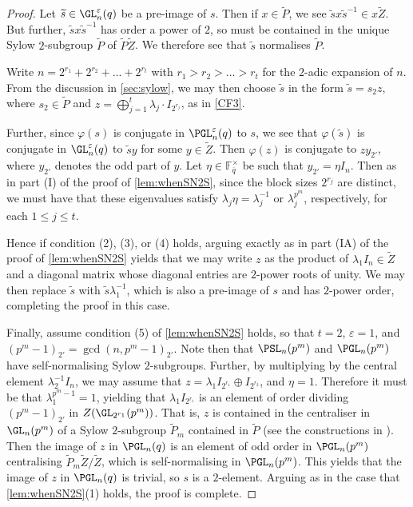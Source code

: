 \documentclass[eqthmnum, nocolour]{jt-calcs}
\newcommand{\wt}[1]{\widetilde{#1}}
\renewcommand{\epsilon}{\varepsilon}
\begin{document}
\begin{proof}
Let $\wt{s}\in \GL^\epsilon_n(q)$ be a pre-image of $s$.     Then if $x\in\wt{P}$, we see $\wt{s}x\wt{s}^{-1}\in x \wt{Z}$. But further, $\wt{s}x\wt{s}^{-1}$ has order a power of $2$, so must be contained in the unique Sylow $2$-subgroup $\wt{P}$ of $\wt{P}\wt{Z}$.  We therefore see that $\wt{s}$ normalises $\wt{P}$.  

Write $n=2^{r_1}+2^{r_2}+...+2^{r_t}$ with $r_1>r_2>...>r_t$ for the $2$-adic expansion of $n$.  From the discussion in \cref{sec:sylow}, we may then choose $\wt{s}$ in the form $\wt{s}=s_2z$, where $s_2\in \wt{P}$ and $z=\bigoplus_{j=1}^t \lambda_j\cdot I_{2^{r_j}}$, as in \eqref{CF3}.

Further, since $\varphi(s)$ is conjugate in $\PGL^\epsilon_n(q)$ to $s$, we see that $\varphi(\tilde{s})$ is conjugate in $\GL^\epsilon_n(q)$ to $\wt{s}y$ for some $y\in\wt{Z}$.  Then $ \varphi(z)$ is conjugate to $z y_{2'}$, where $y_{2'}$ denotes the odd part of $y$.  Let $\eta\in \mathbb{F}_{\overline{q}}^\times$ be such that $y_{2'}=\eta I_{n}$. Then as in part (I) of the proof of \cref{lem:whenSN2S}, since the block sizes $2^{r_j}$ are distinct, we must have that these eigenvalues satisfy $\lambda_j\eta=\lambda_j^{-1}$ or   $\lambda_j^{p^m}$, respectively, for each $1\leq j\leq t$.  

Hence if condition (2), (3), or (4) holds, arguing exactly as in part (IA) of the proof of \cref{lem:whenSN2S} yields that we may write $z$ as the product of $\lambda_1I_n\in\wt{Z}$ and a diagonal matrix whose diagonal entries are $2$-power roots of unity.  We may then replace $\wt{s}$ with $\wt{s}\lambda_1^{-1}$, which is also a pre-image of $s$ and has $2$-power order, completing the proof in this case.

Finally, assume condition (5) of \cref{lem:whenSN2S} holds, so that $t=2$, $\epsilon=1$, and $(p^m-1)_{2'}=\gcd(n, p^m-1)_{2'}$.  Note then that $\PSL_n(p^m)$ and $\PGL_n(p^m)$ have self-normalising Sylow $2$-subgroups.  Further, by multiplying by the central element $\lambda_2^{-1}I_n$, we may assume that $z=\lambda_1 I_{2^{r_1}}\oplus I_{2^{r_2}}$, and $\eta=1$.  Therefore it must be that $\lambda_1^{p^m-1}=1$, yielding that $\lambda_1 I_{2^{r_1}}$ is an element of order dividing $(p^m-1)_{2'}$ in $Z(\GL_{2^{r_1}}(p^m))$.  That is, $z$ is contained in the centraliser in $\GL_n(p^m)$ of a Sylow $2$-subgroup $\wt{P}_m$ contained in $\wt{P}$ (see the constructions in \cite{carter-fong:1964:the-Sylow-2-subgroups}).  Then the image of $z$ in $\PGL_n(q)$ is an element of odd order in $\PGL_n(p^m)$ centralising $\wt{P}_m\wt{Z}/\wt{Z}$, which is self-normalising in $\PGL_n(p^m)$.  This yields that the image of $z$ in $\PGL_n(q)$ is trivial, so $s$ is a $2$-element.  Arguing as in the case that \cref{lem:whenSN2S}(1) holds, the proof is complete.
\end{proof}
\end{document}
